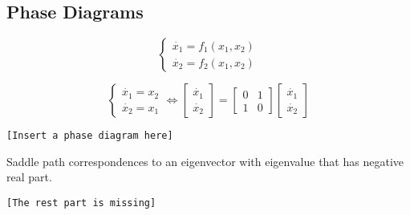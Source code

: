 \documentclass[twoside]{article}
\begin{document}
\subsection*{Phase Diagrams}
\begin{equation}
    \begin{cases}
        \dot{x_{1}} = f_{1}(x_{1}, x_{2})\\
        \dot{x_{2}} = f_{2}(x_{1}, x_{2})
    \end{cases}
\end{equation}
\begin{example}
    \begin{equation}
    \begin{cases}
        \dot{x_{1}} = x_{2}\\
        \dot{x_{2}} = x_{1}
    \end{cases} \iff
    \begin{bmatrix}
        \dot{x_{1}} \\
        \dot{x_{2}} 
    \end{bmatrix} = 
    \begin{bmatrix}
        0&1\\
        1&0
    \end{bmatrix}
    \begin{bmatrix}
        \dot{x_{1}} \\
        \dot{x_{2}} 
    \end{bmatrix}
\end{equation}
\begin{center}
    \texttt{[Insert a phase diagram here]}
\end{center}
\end{example}
\begin{remark}
    Saddle path correspondences to an eigenvector with eigenvalue that has negative real part.
\end{remark}

\begin{center}
    \texttt{[The rest part is missing]}    
\end{center}

\end{document}

